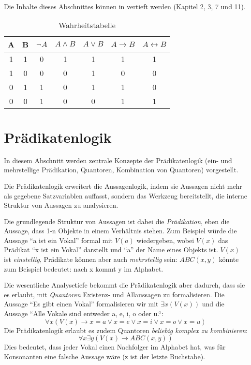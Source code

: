 Die Inhalte dieses Abschnittes können in \cite{link} vertieft werden (Kapitel 2, 3, 7 und 11).

\begin{table}[ht]
    \caption{Wahrheitstabelle}
    \centering
    \begin{tabular}{|c|c|c|c|c|c|c|}
    \hline
          A
        & B
        & $\neg A$
        & $A \wedge B$
        & $A \vee B$
        & $A \rightarrow B$
        & $A \leftrightarrow B$
        \\
        \hline
          1
        & 1
        & 0
        & 1
        & 1
        & 1
        & 1
        \\
        \hline
          1
        & 0
        & 0
        & 0
        & 1
        & 0
        & 0
        \\
        \hline
          0
        & 1
        & 1
        & 0
        & 1
        & 1
        & 0
        \\
        \hline
          0
        & 0
        & 1
        & 0
        & 0
        & 1
        & 1
        \\

    \hline
    \end{tabular}
    \label{tab:al}
\end{table}


\section{Prädikatenlogik}\label{pl}

In diesem Abschnitt werden zentrale Konzepte der Prädikatenlogik
(ein- und mehrstellige Prädikation, Quantoren, Kombination von Quantoren)
vorgestellt.

Die Prädikatenlogik erweitert die Aussagenlogik,
indem sie Aussagen nicht mehr als gegebene Satzvariablen auffasst,
sondern das Werkzeug bereitstellt,
die interne Struktur von Aussagen zu analysieren.

Die grundlegende Struktur von Aussagen ist dabei die \emph{Prädikation},
eben die Aussage, dass 1-n Objekte in einem Verhältnis stehen.
Zum Beispiel würde die Aussage
``a ist ein Vokal'' formal mit $V(a)$ wiedergeben,
wobei $V(x)$ das Prädikat ``x ist ein Vokal'' darstellt
und ``a'' der Name eines Objekts ist.
$V(x)$ ist \emph{einstellig},
Prädikate können aber auch \emph{mehrstellig} sein:
$ABC(x,y)$ könnte zum Beispiel bedeutet: nach x kommt y im Alphabet.

Die wesentliche Analysetiefe bekommt die Prädikatenlogik aber dadurch,
dass sie es erlaubt, mit \emph{Quantoren} Existenz- und Allaussagen zu formalisieren.
Die Aussage ``Es gibt einen Vokal'' formalisieren wir mit $\exists x(V(x))$
und die Aussage ``Alle Vokale sind entweder a, e, i, o oder u.``:
\[\forall x (V(x) \rightarrow x = a \vee x = e \vee x = i \vee x = o \vee x = u)\]
Die Prädikatenlogik erlaubt es zudem Quantoren \emph{beliebig komplex zu kombinieren}:
\[\forall x \exists y(V(x) \rightarrow ABC(x,y))\]
Dies bedeutet, dass jeder Vokal einen Nachfolger im Alphabet hat,
was für Konsonanten eine falsche Aussage wäre (z ist der letzte Buchstabe).

